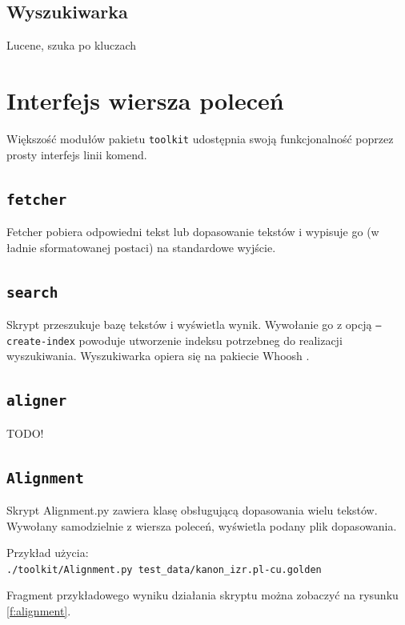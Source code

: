 \documentclass{pracamgr}
\begin{document}
\section{Wyszukiwarka}

Lucene, szuka po kluczach


\chapter{Interfejs wiersza poleceń}\label{r:cli}

Większość modułów pakietu {\tt toolkit} udostępnia swoją
funkcjonalność poprzez prosty interfejs linii komend.

\section{{\tt fetcher}}

Fetcher pobiera odpowiedni tekst lub dopasowanie tekstów i wypisuje go
(w ładnie sformatowanej postaci) na standardowe wyjście.

\section{{\tt search}}

Skrypt przeszukuje bazę tekstów i wyświetla wynik. Wywołanie go z
opcją {\tt --create-index} powoduje utworzenie indeksu potrzebneg do
realizacji wyszukiwania. Wyszukiwarka opiera się na pakiecie Whoosh
\cite{whoosh}.

\section{{\tt aligner}}

TODO!

\section{{\tt Alignment}}

Skrypt Alignment.py zawiera klasę obsługującą dopasowania wielu
tekstów. Wywołany samodzielnie z wiersza poleceń, wyświetla podany
plik dopasowania.

Przykład użycia: \\
{\tt ./toolkit/Alignment.py test\_data/kanon\_izr.pl-cu.golden}

Fragment przykładowego wyniku działania skryptu można zobaczyć na
rysunku \ref{f:alignment}.
\end{document}
